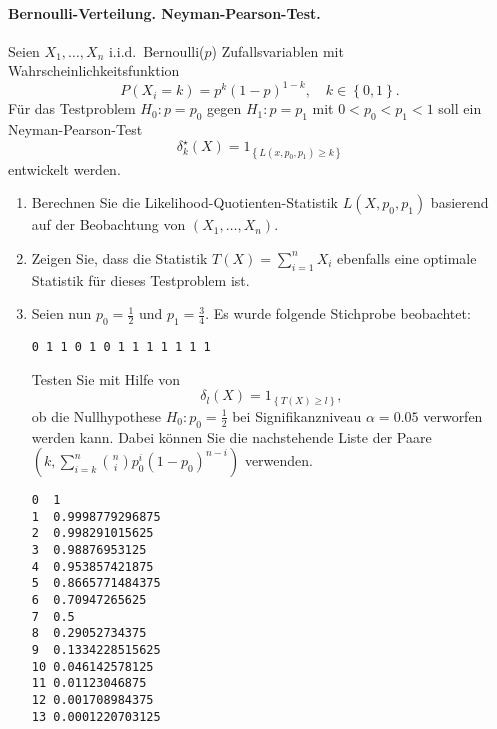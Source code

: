 \paragraph{Bernoulli-Verteilung. Neyman-Pearson-Test.} Seien $X_1,\ldots,X_n$ 
i.i.d.\ Bernoulli($p$) Zufallsvariablen mit Wahrscheinlichkeitsfunktion
\begin{equation*}
    P(X_i = k) = p^{k} \left( 1-p \right)^{1-k}, \quad k\in\left\{ 0,1 \right\}.
\end{equation*}
Für das Testproblem $H_0 : p=p_0$ gegen $H_1 : p=p_1$ mit $0<p_0<p_1<1$ 
soll ein Neyman-Pearson-Test
\begin{equation*}
    \delta_k^\star (X) = 1_{ \left\{ L(x,p_0,p_1)\geq k \right\}  }
\end{equation*}
entwickelt werden.
\begin{enumerate}
    \item Berechnen Sie die Likelihood-Quotienten-Statistik $L(X,p_0,p_1)$ basierend auf der
        Beobachtung von $\left( X_1,\ldots,X_n \right)$.
    \item Zeigen Sie, dass die Statistik $T(X)= \sum_{i=1}^{n} X_i$ ebenfalls eine
        optimale Statistik für dieses Testproblem ist.
    \item Seien nun $p_0=\frac{1}{2}$ und $p_1=\frac{3}{4}$. Es wurde folgende Stichprobe beobachtet:
        \begin{lstlisting}
0 1 1 0 1 0 1 1 1 1 1 1 1
        \end{lstlisting}
        Testen Sie mit Hilfe von 
        \begin{equation}
            \delta_l(X) = 1_{   \left\{ T(X) \geq l \right\}},
        \end{equation}
        ob die Nullhypothese $H_0 : p_0=\frac{1}{2}$ bei Signifikanzniveau $\alpha=0.05$
        verworfen werden kann. Dabei können Sie die nachstehende Liste der Paare 
        $\left( k, \sum_{i=k}^{n} \binom{n}{i} p_0^i \left( 1-p_0 \right)^{n-i} \right)$ verwenden.
        \begin{lstlisting}
0  1
1  0.9998779296875
2  0.998291015625
3  0.98876953125
4  0.953857421875
5  0.8665771484375
6  0.70947265625
7  0.5
8  0.29052734375
9  0.1334228515625
10 0.046142578125
11 0.01123046875
12 0.001708984375
13 0.0001220703125
\end{lstlisting}            

\end{enumerate}



